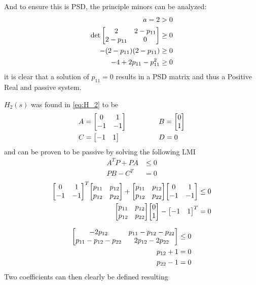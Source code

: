 \documentclass[letter]{article}
\begin{document}
And to ensure this is PSD, the principle minors can be analyzed:
\begin{align}
	a = 2 &> 0\\
	\det\mqty[2 & 2 - p_{11}\\ 2 - p_{11} & 0] &\geq 0\\
	-(2-p_{11})(2-p_{11}) &\geq 0\\
	-4 +2 p_{11} - p_{11}^2 &\geq 0
\end{align}
it is clear that a solution of $p_{11} = 0$ results in a PSD matrix and thus a Positive Real and passive system.

\newpage
$H_2(s)$ was found in \eqref{eq:H_2} to be
\begin{equation}\nonumber
	\begin{aligned}
		&A = \mqty[0 &1\\ -1 &-1] \hspace{0.5in} &&B = \mqty[0\\ 1]\\
		&C = \mqty[-1 & 1] \hspace{0.5in} &&D = 0
	\end{aligned}
\end{equation}
and can be proven to be passive by solving the following LMI
\begin{align}
	A^T P + P A &\leq 0\\
	P B - C^T &= 0
\end{align}
\begin{align}
	\mqty[0 &1\\ -1 &-1]^T \mqty[p_{11} & p_{12}\\ p_{12} & p_{22}] + \mqty[p_{11} & p_{12}\\ p_{12} & p_{22}] \mqty[0 &1\\ -1 &-1] &\leq 0\\
	\mqty[p_{11} & p_{12}\\ p_{12} & p_{22}] \mqty[0\\ 1] - \mqty[-1 & 1]^T &= 0
\end{align}

\begin{align}
	\mqty[-2p_{12} & p_{11} - p_{12} - p_{22}\\ p_{11} - p_{12} - p_{22} & 2 p_{12} - 2 p_{22}] &\leq 0\\
	p_{12} + 1 &= 0\\
	p_{22} - 1 &= 0
\end{align}
Two coefficients can then clearly be defined resulting
\end{document}
